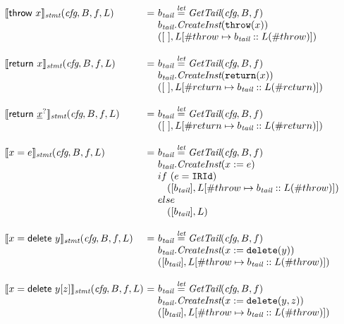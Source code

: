 \[
\begin{array}{l@{}l@{~}l}
\transfun{\irthrow{x}}_{\emph{stmt}}(\emph{cfg}, B, f, L) & = &
b_{\emph{tail}} \letval \GetTail(\emph{cfg}, B, f)\\
& & b_{\emph{tail}}.\emph{CreateInst}(\TT{throw}(x))\\
& & ([\ ], L[\#throw \mapsto b_{\emph{tail}}::L(\#throw)])\\
& & \\

\transfun{\ircfgreturn{x}}_{\emph{stmt}}(\emph{cfg}, B, f, L) & = &
b_{\emph{tail}} \letval \GetTail(\emph{cfg}, B, f)\\
& & b_{\emph{tail}}.\emph{CreateInst}(\TT{return}(x))\\
& & ([\ ], L[\#return \mapsto b_{\emph{tail}}::L(\#return)])\\
& & \\

\transfun{\irreturn{}}_{\emph{stmt}}(\emph{cfg}, B, f, L) & = &
b_{\emph{tail}} \letval \GetTail(\emph{cfg}, B, f)\\
& & ([\ ], L[\#return \mapsto b_{\emph{tail}}::L(\#return)])\\
& & \\

\transfun{\ircfgexpr{x}{e}}_{\emph{stmt}}(\emph{cfg}, B, f, L) & = &
b_{\emph{tail}} \letval \GetTail(\emph{cfg}, B, f)\\
& & b_{\emph{tail}}.\emph{CreateInst}(x := e)\\
& & if\ (e = \TT{IRId}) \\
& & \phantom{if} ([b_{\emph{tail}}], L[\#throw \mapsto b_{\emph{tail}}::L(\#throw)])\\
& & else \\
& & \phantom{if} ([b_{\emph{tail}}], L)\\
& & \\

\transfun{\irdelete{x}{y}}_{\emph{stmt}}(\emph{cfg}, B, f, L) & = &
b_{\emph{tail}} \letval \GetTail(\emph{cfg}, B, f)\\
& & b_{\emph{tail}}.\emph{CreateInst}(x := \TT{delete}(y))\\
& & ([b_{\emph{tail}}], L[\#throw \mapsto b_{\emph{tail}}::L(\#throw)])\\
& & \\

\transfun{\irdeleteobj{x}{y}{z}}_{\emph{stmt}}(\emph{cfg}, B, f, L)\ & = &
b_{\emph{tail}} \letval \GetTail(\emph{cfg}, B, f)\\
& & b_{\emph{tail}}.\emph{CreateInst}(x := \TT{delete}(y,z))\\
& & ([b_{\emph{tail}}], L[\#throw \mapsto b_{\emph{tail}}::L(\#throw)])\\
& & \\


\end{array}\]
